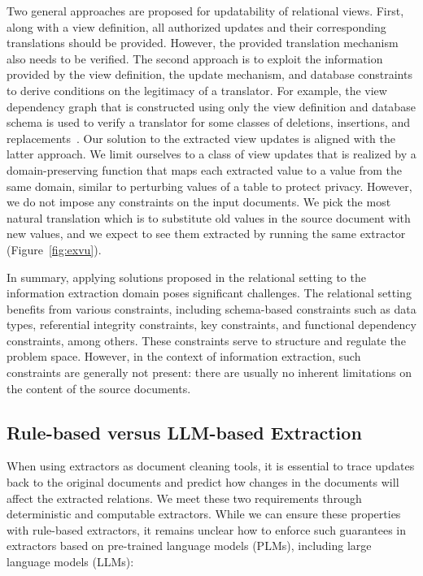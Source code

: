 Two general approaches are proposed for updatability of relational views.  First, along with a view definition, all authorized updates and their corresponding translations should be provided. However, the provided translation mechanism also needs to be verified. The second approach is to exploit the information provided by the view definition, the update mechanism, and database constraints to derive conditions on the legitimacy of a translator. For example, the view dependency graph that is constructed using only the view definition and database schema is used to verify a translator for some classes of deletions, insertions, and replacements~\cite{DBLP:journals/tods/DayalB82}. Our solution to the extracted view updates is aligned with the latter approach.  We limit ourselves to a class of view updates that is realized by a domain-preserving function that maps each extracted value to a value from the same domain, similar to perturbing values of a table to protect privacy.  However,  we do not impose any constraints on the input documents. 
We pick the most natural translation which is to substitute old values in the source document with new values, and we expect to see them extracted by running the same extractor (Figure~\ref{fig:exvu}).\par
In summary, applying solutions proposed in the relational setting to the information extraction domain poses significant challenges. The relational setting benefits from various constraints, including schema-based constraints such as data types, referential integrity constraints, key constraints, and functional dependency constraints, among others. These constraints serve to structure and regulate the problem space. However, in the context of information extraction, such constraints are generally not present: there are usually no inherent limitations on the content of the source documents.

\subsection{Rule-based  versus LLM-based Extraction}\label{subsubsec:whyrulebase}  


When using extractors as document cleaning tools, it is essential to trace updates back to the original documents and predict how changes in the documents will affect the extracted relations. We meet these two requirements through deterministic and computable extractors. While we can ensure these properties with rule-based extractors, it remains unclear how to enforce such guarantees in extractors based on pre-trained language models (PLMs), including large language models (LLMs):

